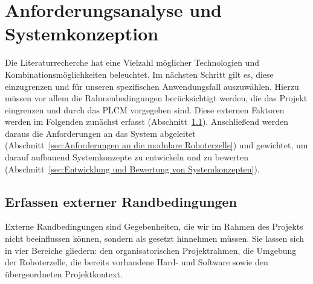 \cleardoublepage
\chapter{Anforderungsanalyse und Systemkonzeption}
\label{ch:Kapt3}





Die Literaturrecherche hat eine Vielzahl möglicher Technologien und Kombinationsmöglichkeiten beleuchtet. Im nächsten Schritt gilt es, diese einzugrenzen und für unseren spezifischen Anwendungsfall auszuwählen. Hierzu müssen vor allem die Rahmenbedingungen berücksichtigt werden, die das Projekt eingrenzen und durch das PLCM vorgegeben sind. Diese externen Faktoren werden im Folgenden zunächst erfasst (Abschnitt~\ref{sec:Erfassen externer Randbedingungen}). Anschließend werden daraus die Anforderungen an das System abgeleitet (Abschnitt~\ref{sec:Anforderungen an die modulare Roboterzelle}) und gewichtet, um darauf aufbauend Systemkonzepte zu entwickeln und zu bewerten (Abschnitt~\ref{sec:Entwicklung und Bewertung von Systemkonzepten}).


\section{Erfassen externer Randbedingungen}
\label{sec:Erfassen externer Randbedingungen}


Externe Randbedingungen sind Gegebenheiten, die wir im Rahmen des Projekts nicht beeinflussen können, sondern als gesetzt hinnehmen müssen. Sie lassen sich in vier Bereiche gliedern: den organisatorischen Projektrahmen, die Umgebung der Roboterzelle, die bereits vorhandene Hard- und Software sowie den übergeordneten Projektkontext.


